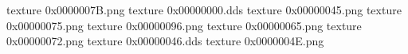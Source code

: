 texture 0x0000007B.png
texture 0x00000000.dds
texture 0x00000045.png
texture 0x00000075.png
texture 0x00000096.png
texture 0x00000065.png
texture 0x00000072.png
texture 0x00000046.dds
texture 0x0000004E.png
